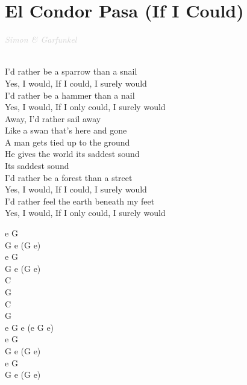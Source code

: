 \documentclass[a5paper, 10pt]{book}
\begin{document}
\section{El Condor Pasa (If I Could)}\textcolor{lightgray}{\textit{Simon \& Garfunkel}}\\~\\
\begin{minipage}[t]{0.8\textwidth}
I'd rather be a sparrow than a snail\\
Yes, I would, If I could, I surely would\\

I'd rather be a hammer than a nail\\
Yes, I would, If I only could, I surely would\\

\hspace*{5mm}Away, I'd rather sail away\\
\hspace*{5mm}Like a swan that's here and gone\\
\hspace*{5mm}A man gets tied up to the ground\\
\hspace*{5mm}He gives the world its saddest sound\\
\hspace*{5mm}Its saddest sound\\

I'd rather be a forest than a street\\
Yes, I would, If I could, I surely would\\

I'd rather feel the earth beneath my feet\\
Yes, I would, If I only could, I surely would\\
\end{minipage}
\begin{minipage}[t]{0.2\textwidth}
e G\\
G e (G e)\\

e G\\
G e (G e)\\

C\\
G\\
C\\
G\\
e G e (e G e)\\

e G\\
G e (G e)\\

e G\\
G e (G e)\\

\end{minipage}
\end{document}
